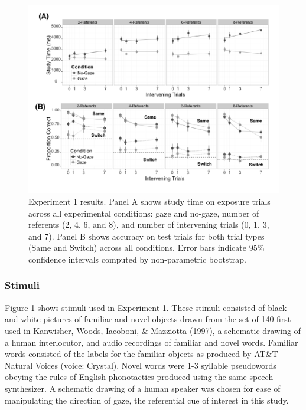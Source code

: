 \documentclass[a4paper,man,natbib]{apa6}
\newenvironment{CodeChunk}{}{}
\begin{document}
\begin{CodeChunk}
\begin{figure}
\includegraphics{figs/expt1-plot-1} \caption[Experiment 1 results]{Experiment 1 results. Panel A shows study time on exposure trials across all experimental conditions: gaze and no-gaze, number of referents (2, 4, 6, and 8), and number of intervening trials (0, 1, 3, and 7). Panel B shows accuracy on test trials for both trial types (Same and Switch) across all conditions. Error bars indicate 95\% confidence intervals computed by non-parametric bootstrap.}\label{fig:expt1-plot}
\end{figure}
\end{CodeChunk}

\subsubsection{Stimuli}\label{stimuli}

Figure 1 shows stimuli used in Experiment 1. These stimuli consisted of
black and white pictures of familiar and novel objects drawn from the
set of 140 first used in Kanwisher, Woods, Iacoboni, \& Mazziotta
(1997), a schematic drawing of a human interlocutor, and audio
recordings of familiar and novel words. Familiar words consisted of the
labels for the familiar objects as produced by AT\&T Natural Voices
\texttrademark (voice: Crystal). Novel words were 1-3 syllable
pseudowords obeying the rules of English phonotactics produced using the
same speech synthesizer. A schematic drawing of a human speaker was
chosen for ease of manipulating the direction of gaze, the referential
cue of interest in this study.
\end{document}
